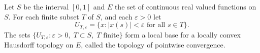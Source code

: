 Let $S$ be the interval $[0,1]$ and $E$ the set of continuous real valued functions on $S$. For each finite subset $T$ of $S$, and each $\varepsilon > 0$ let
$$
U_{T,\varepsilon} = \{ x : |x(s)| < \varepsilon \text{ for all } s \in T \}.
$$
The sets $\{ U_{T,\varepsilon} : \varepsilon > 0,\; T \subset S,\; T \text{ finite} \}$ form a local base for a locally convex Hausdorff topology on $E$, called the topology of pointwise convergence.
